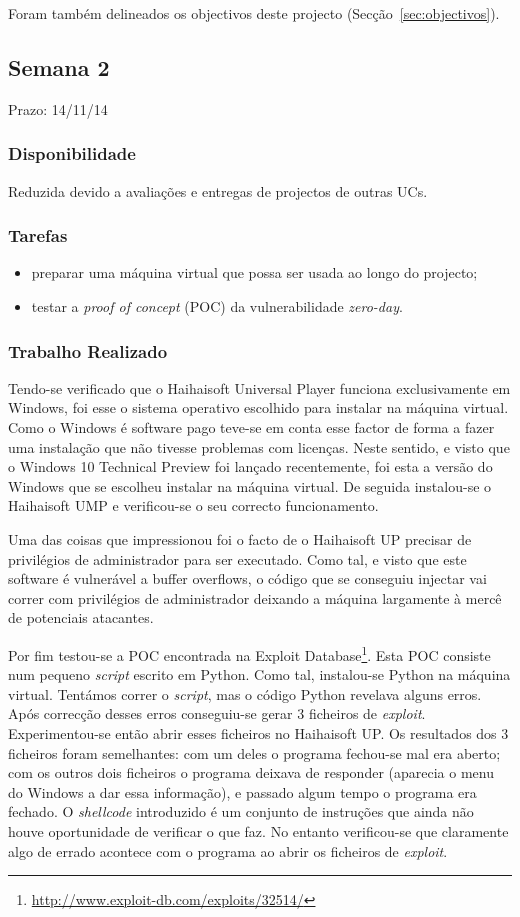 \documentclass[a4paper]{article}
\begin{document}
Foram também delineados os objectivos deste projecto (Secção~\ref{sec:objectivos}).

\subsection{Semana 2}
Prazo: 14/11/14
\subsubsection{Disponibilidade}
Reduzida devido a avaliações e entregas de projectos de outras UCs.

\subsubsection{Tarefas}
\begin{itemize}
\item preparar uma máquina virtual que possa ser usada ao longo do projecto;
\item testar a \textit{proof of concept} (POC) da vulnerabilidade \textit{zero-day}.
\end{itemize}

\subsubsection{Trabalho Realizado}
Tendo-se verificado que o Haihaisoft Universal Player funciona exclusivamente em Windows, foi esse o sistema operativo escolhido para instalar na máquina virtual. Como o Windows é software pago teve-se em conta esse factor de forma a fazer uma instalação que não tivesse problemas com licenças. Neste sentido, e visto que o Windows 10 Technical Preview foi lançado recentemente, foi esta a versão do Windows que se escolheu instalar na máquina virtual. De seguida instalou-se o Haihaisoft UMP e verificou-se o seu correcto funcionamento.

Uma das coisas que impressionou foi o facto de o Haihaisoft UP precisar de privilégios de administrador para ser executado. Como tal, e visto que este software é vulnerável a buffer overflows, o código que se conseguiu injectar vai correr com privilégios de administrador deixando a máquina largamente à mercê de potenciais atacantes.

Por fim testou-se a POC encontrada na Exploit Database\footnote{\url{http://www.exploit-db.com/exploits/32514/}}. Esta POC consiste num pequeno \textit{script} escrito em Python. Como tal, instalou-se Python na máquina virtual. Tentámos correr o \textit{script}, mas o código Python revelava alguns erros. Após correcção desses erros conseguiu-se gerar 3 ficheiros de \textit{exploit}. Experimentou-se então abrir esses ficheiros no Haihaisoft UP. Os resultados dos 3 ficheiros foram semelhantes: com um deles o programa fechou-se mal era aberto; com os outros dois ficheiros o programa deixava de responder (aparecia o menu do Windows a dar essa informação), e passado algum tempo o programa era fechado. O \textit{shellcode} introduzido é um conjunto de instruções que ainda não houve oportunidade de verificar o que faz. No entanto verificou-se que claramente algo de errado acontece com o programa ao abrir os ficheiros de \textit{exploit}.
\end{document}
